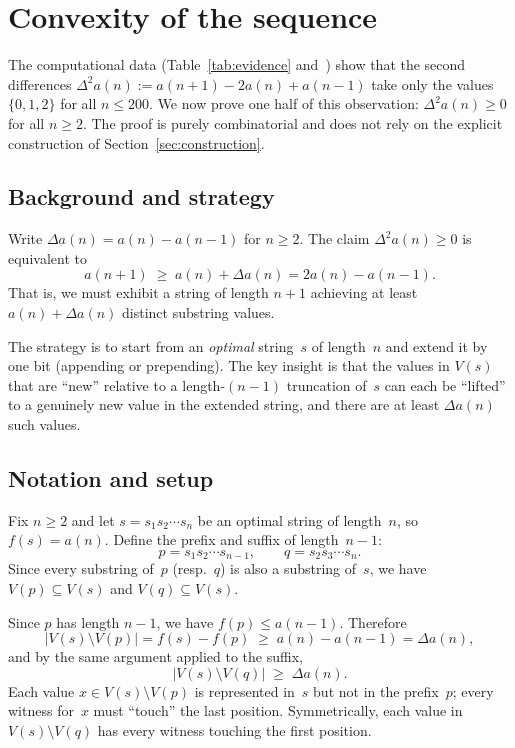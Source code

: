 ﻿\documentclass[11pt,a4paper]{article}
\theoremstyle{plain}
\theoremstyle{definition}
\theoremstyle{remark}
\begin{document}
\section{Convexity of the sequence}\label{sec:convex}

The computational data (Table~\ref{tab:evidence} and~\cite{github})
show that the second differences
$\Delta^2 a(n):=a(n+1)-2a(n)+a(n-1)$ take only the values
$\{0,1,2\}$ for all $n\le200$.  We now prove one half of this
observation: $\Delta^2 a(n)\ge0$ for all $n\ge2$.  The proof is purely
combinatorial and does not rely on the explicit construction of
Section~\ref{sec:construction}.

\subsection{Background and strategy}

Write $\Delta a(n)=a(n)-a(n-1)$ for $n\ge2$.  The claim
$\Delta^2 a(n)\ge0$ is equivalent to
\begin{equation}\label{eq:convex-equiv}
  a(n+1)\;\ge\;a(n)+\Delta a(n)=2a(n)-a(n-1).
\end{equation}
That is, we must exhibit a string of length $n+1$ achieving at least
$a(n)+\Delta a(n)$ distinct substring values.

The strategy is to start from an \emph{optimal} string~$s$ of
length~$n$ and extend it by one bit (appending or prepending).  The key
insight is that the values in $V(s)$ that are ``new'' relative to a
length-$(n{-}1)$ truncation of~$s$ can each be ``lifted'' to a
genuinely new value in the extended string, and there are at least
$\Delta a(n)$ such values.

\subsection{Notation and setup}

Fix $n\ge2$ and let $s=s_1 s_2\cdots s_n$ be an optimal string of
length~$n$, so $f(s)=a(n)$.  Define the prefix and suffix of
length~$n-1$:
\begin{equation}\label{eq:pq}
  p=s_1 s_2\cdots s_{n-1},\qquad q=s_2 s_3\cdots s_n.
\end{equation}
Since every substring of~$p$ (resp.\ $q$) is also a substring of~$s$,
we have $V(p)\subseteq V(s)$ and $V(q)\subseteq V(s)$.

Since $p$ has length $n-1$, we have $f(p)\le a(n-1)$.  Therefore
\begin{equation}\label{eq:Vdiff-p}
  |V(s)\setminus V(p)| = f(s)-f(p)
    \;\ge\; a(n)-a(n-1)=\Delta a(n),
\end{equation}
and by the same argument applied to the suffix,
\begin{equation}\label{eq:Vdiff-q}
  |V(s)\setminus V(q)| \;\ge\; \Delta a(n).
\end{equation}
Each value $x\in V(s)\setminus V(p)$ is represented in~$s$ but not
in the prefix~$p$; every witness for~$x$ must ``touch'' the last
position.  Symmetrically, each value in $V(s)\setminus V(q)$ has every
witness touching the first position.
\end{document}
